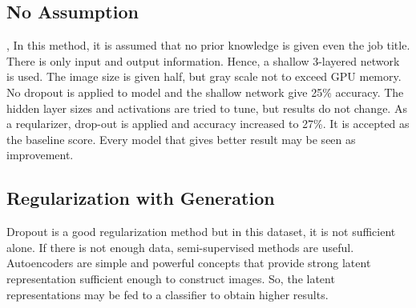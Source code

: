 \documentclass[12pt, letterpaper]{article}
\begin{document}
\subsection{No Assumption},
	In this method, it is assumed that no prior knowledge is given even the job title. There is only input and output information. Hence, a shallow 3-layered network is used. The image size is given half, but gray scale not to exceed GPU memory. \\
	No dropout is applied to model and the shallow network give 25\% accuracy. The hidden layer sizes and activations are tried to tune, but results do not change. As a reqularizer, drop-out is applied and accuracy increased to 27\%. It is accepted as the baseline score. Every model that gives better result may be seen as improvement.
\subsection{Regularization with Generation}
	Dropout is a good regularization method but in this dataset, it is not sufficient alone. If there is not enough data, semi-supervised methods are useful. Autoencoders are simple and powerful concepts that provide strong latent representation sufficient enough to construct images. So, the latent representations may be fed to a classifier to obtain higher results.
\end{document}
